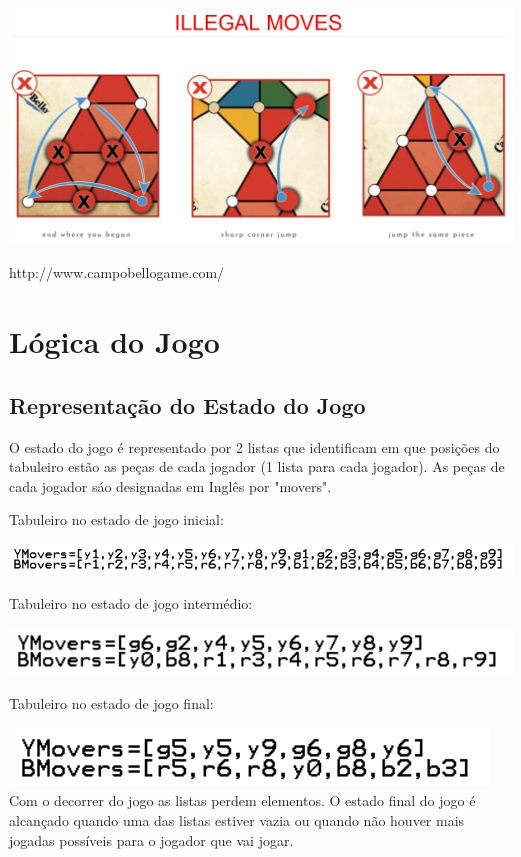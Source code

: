 \documentclass[a4paper]{article}
\begin{document}
\includegraphics[scale=0.3]{illegalMoves.PNG}\linebreak\linebreak

http://www.campobellogame.com/


\section{Lógica do Jogo}

\subsection{Representação do Estado do Jogo} O estado do jogo é representado por 2 listas que identificam em que posições do tabuleiro estão as peças de cada jogador (1 lista para cada jogador). As peças de cada jogador sáo designadas em Inglês por "movers".\linebreak
\begin{flushleft} 
Tabuleiro no estado de jogo inicial:
\end{flushleft}
\includegraphics[scale=0.6]{initialBoard.png}\linebreak\linebreak
\begin{flushleft} 
Tabuleiro no estado de jogo intermédio:
\end{flushleft}
\includegraphics[scale=0.6]{midBoard.png}\linebreak\linebreak
\begin{flushleft} 
Tabuleiro no estado de jogo final:
\end{flushleft}
\includegraphics[scale=0.6]{finalBoard.png}\linebreak\linebreak 
Com o decorrer do jogo as listas perdem elementos. O estado final do jogo é alcançado quando uma das listas estiver vazia ou quando não houver mais jogadas possíveis para o jogador que vai jogar.
\end{document}

